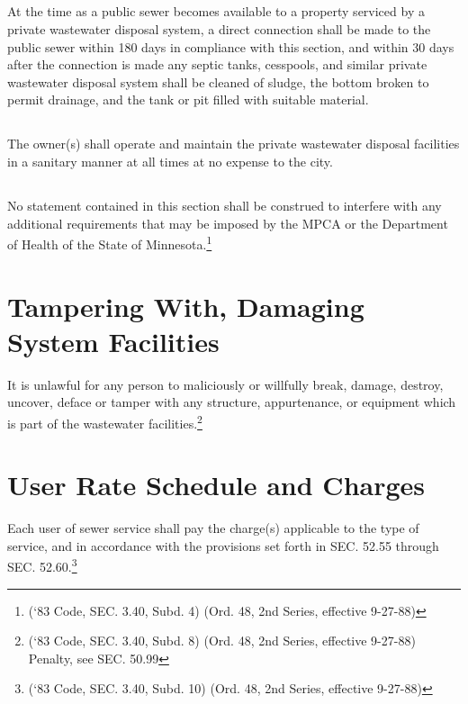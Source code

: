 \subsection{}
At the time as a public sewer becomes available to a property serviced by a private wastewater disposal system, a direct connection shall be made to the public sewer within 180 days in compliance with this section, and within 30 days after the connection is made any septic tanks, cesspools, and similar private wastewater disposal system shall be cleaned of sludge, the bottom broken to permit drainage, and the tank or pit filled with suitable material.
\subsection{}
The owner(s) shall operate and maintain the private wastewater disposal facilities in a sanitary manner at all times at no expense to the city.
\subsection{}
No statement contained in this section shall be construed to interfere with any additional requirements that may be imposed by the MPCA or the Department of Health of the State of Minnesota.\footnote{(‘83 Code, SEC. 3.40, Subd. 4) (Ord. 48, 2nd Series, effective 9-27-88)}

\section{Tampering With, Damaging System Facilities}
It is unlawful for any person to maliciously or willfully break, damage, destroy, uncover, deface or tamper with any structure, appurtenance, or equipment which is part of the wastewater facilities.\footnote{(‘83 Code, SEC. 3.40, Subd. 8) (Ord. 48, 2nd Series, effective 9-27-88) Penalty, see SEC. 50.99}

\section{User Rate Schedule and Charges}
Each user of sewer service shall pay the charge(s) applicable to the type of service, and in accordance with the provisions set forth in SEC. 52.55 through SEC. 52.60.\footnote{(‘83 Code, SEC. 3.40, Subd. 10) (Ord. 48, 2nd Series, effective 9-27-88)}\\



